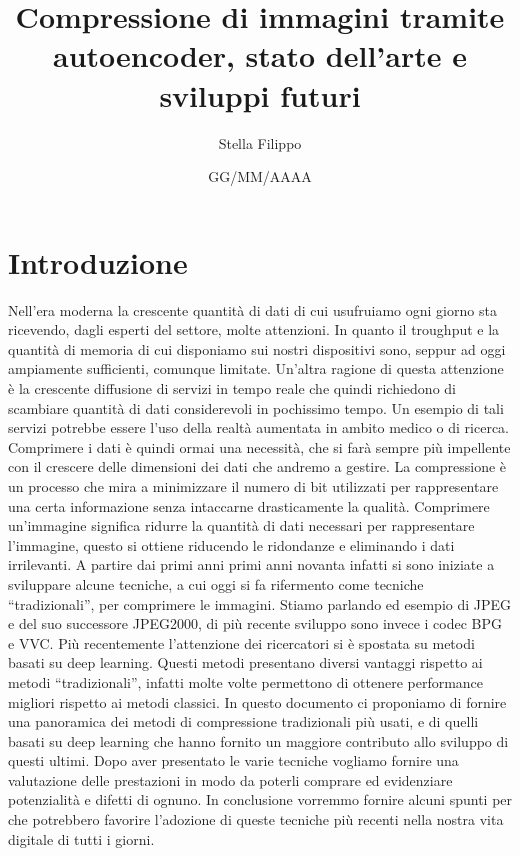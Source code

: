 \documentclass[12pt,a4paper,twoside,openright]{extreport}
\title{Compressione di immagini tramite autoencoder, stato dell’arte e sviluppi futuri}
\author{Stella Filippo}
\date{GG/MM/AAAA}
\begin{document}
    \pagestyle{empty} %

    
    \cleardoublepage
    
    
    \cleardoublepage

    \pagestyle{plain} %

    \chapter*{Introduzione}
    Nell’era moderna la crescente quantità di dati di cui usufruiamo ogni giorno sta ricevendo, dagli esperti del settore, molte attenzioni. In quanto il troughput e la quantità di memoria di cui disponiamo sui nostri dispositivi sono, seppur ad oggi ampiamente sufficienti, comunque limitate. Un’altra ragione di questa attenzione è la crescente diffusione di servizi in tempo reale che quindi richiedono di scambiare quantità di dati considerevoli in pochissimo tempo. Un esempio di tali servizi potrebbe essere l’uso della realtà aumentata in ambito medico o di ricerca. Comprimere i dati è quindi ormai una necessità, che si farà sempre più impellente con il crescere delle dimensioni dei dati che andremo a gestire.
    La compressione è un processo che mira a minimizzare il numero di bit utilizzati per rappresentare una certa informazione senza intaccarne drasticamente la qualità.
    Comprimere un’immagine significa ridurre la quantità di dati necessari per rappresentare l’immagine, questo si ottiene riducendo le ridondanze e eliminando i dati irrilevanti.
    A partire dai primi anni primi anni novanta infatti si sono iniziate a sviluppare alcune tecniche, a cui oggi si fa rifermento come tecniche “tradizionali”, per comprimere le immagini. Stiamo parlando ed esempio di JPEG e del suo successore JPEG2000, di più recente sviluppo sono invece i codec BPG e VVC.
    Più recentemente l’attenzione dei ricercatori si è spostata su metodi basati su deep learning. Questi metodi presentano diversi vantaggi rispetto ai metodi “tradizionali”, infatti molte volte permettono di ottenere performance migliori rispetto ai metodi classici.
    In questo documento ci proponiamo di fornire una panoramica dei metodi di compressione tradizionali più usati, e di quelli basati su deep learning che hanno fornito un maggiore contributo allo sviluppo di questi ultimi. Dopo aver presentato le varie tecniche vogliamo fornire una valutazione delle prestazioni in modo da poterli comprare ed evidenziare potenzialità e difetti di ognuno. In conclusione vorremmo fornire alcuni spunti per che potrebbero favorire l’adozione di queste tecniche più recenti nella nostra vita digitale di tutti i giorni.
    \cleardoublepage
\end{document}
